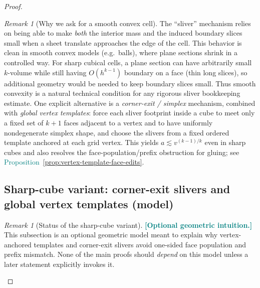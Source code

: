 \documentclass[11pt]{article}
\newcommand{\REVMZ}[1]{\textcolor{teal}{#1}}  %
\numberwithin{equation}{section}  %
\theoremstyle{plain}
\theoremstyle{definition}
\theoremstyle{remark}
\newtheorem{remark}[theorem]{Remark}
\begin{document}
\begin{proof}
\begin{remark}[Why we ask for a smooth convex cell]\label{rem:sliver-cell-shape}
The ``sliver'' mechanism relies on being able to make \emph{both} the interior mass and the induced boundary slices small when a sheet translate
approaches the edge of the cell.  This behavior is clean in smooth convex models (e.g.\ balls), where plane sections shrink in a controlled way.
For sharp cubical cells, a plane section can have arbitrarily small $k$-volume while still having $O(h^{k-1})$ boundary on a face (thin long slices),
so additional geometry would be needed to keep boundary slices small.  Thus smooth convexity is a natural technical condition for any rigorous
sliver bookkeeping estimate.
One explicit alternative is a \emph{corner-exit / simplex} mechanism, combined with \emph{global vertex templates}: force each sliver footprint inside a cube
to meet only a fixed set of $k\!+\!1$ faces adjacent to a vertex and to have uniformly nondegenerate simplex shape, and choose the slivers from a fixed ordered template
anchored at each grid vertex.  This yields $a\lesssim v^{(k-1)/k}$ even in sharp cubes and also resolves the face-population/prefix obstruction for gluing;
see \REVMZ{Proposition~\ref{prop:vertex-template-face-edits}}.
\end{remark}


\subsection*{Sharp-cube variant: corner-exit slivers and global vertex templates (model)}

\begin{remark}[Status of the sharp-cube variant]\label{rem:sharp-cube-variant-status}
\REVMZ{\textbf{[Optional geometric intuition.]}}
This subsection is an optional geometric model meant to explain why vertex-anchored templates and corner-exit slivers
avoid one-sided face population and prefix mismatch.  None of the main proofs should \emph{depend} on this model
unless a later statement explicitly invokes it.
\end{remark}




\end{proof}
\end{document}
